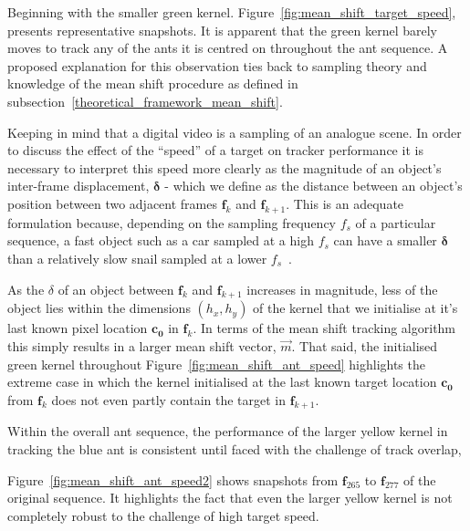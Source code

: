 Beginning with the smaller green kernel.
Figure~\ref{fig:mean_shift_target_speed}, presents representative snapshots. 
It is apparent that the green kernel barely moves to track any of the ants it is
centred on throughout the ant sequence. A proposed explanation for this
observation ties back to sampling theory and knowledge of the mean shift
procedure as defined in subsection~\ref{theoretical_framework_mean_shift}.

Keeping in mind that a digital video is a sampling of an analogue scene.
In order to discuss the effect of the ``speed'' of a target on tracker
performance it is necessary to interpret this speed more clearly
as the magnitude of an object's inter-frame displacement, $\mathbf{\delta}$ - which
we define as the distance between an object's
position between two adjacent frames $\mathbf{f}_k$ and $\mathbf{f}_{k+1}$.
This is an adequate formulation because, depending on the sampling frequency $f_s$ of
a particular sequence, a fast object such as a car sampled at a high $f_s$ can
have a smaller $\mathbf{\delta}$ than a relatively slow snail sampled at a lower
$f_s$~\cite{Tekalp2014}. 

As the $\delta$ of an object between $\mathbf{f}_k$ and $\mathbf{f}_{k+1}$ 
increases in magnitude, less of the object lies within the dimensions
$(h_x,h_y)$ of the kernel that we initialise at it's last known pixel location
$\mathbf{c_0}$ in $\mathbf{f}_k$. In terms of the mean shift tracking algorithm this simply
results in a larger mean shift vector, $\vec{m}$. That said, the initialised green kernel
throughout Figure~\ref{fig:mean_shift_ant_speed} highlights the extreme case in
which the kernel initialised at the last known target location $\mathbf{c_0}$
from $\mathbf{f}_{k}$ does not even partly contain the target in
$\mathbf{f}_{k+1}$.

Within the overall ant sequence, the performance of the larger yellow kernel in
tracking the blue ant is consistent until faced with the challenge
of track overlap, 

Figure~\ref{fig:mean_shift_ant_speed2} shows snapshots from $\mathbf{f}_{265}$ to
$\mathbf{f}_{277}$ of the original sequence. It highlights the fact that even the larger
yellow kernel is not completely robust to the challenge of high target speed. 

